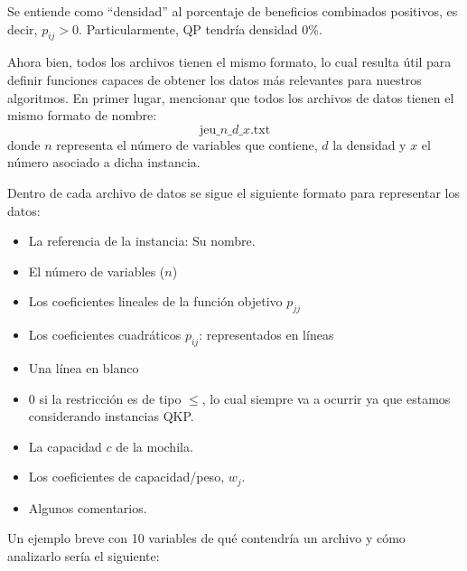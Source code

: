 Se entiende como ``densidad'' al porcentaje de beneficios combinados positivos, es decir, $p_{ij} > 0$. 
Particularmente, QP tendría densidad 0\%.

Ahora bien, todos los archivos tienen el mismo formato, lo cual resulta útil para definir funciones capaces de obtener los datos más relevantes para nuestros algoritmos. 
En primer lugar, mencionar que todos los archivos de datos tienen el mismo formato de nombre:
\begin{equation*}
\text{jeu\_}n\text{\_}d\_x\text{.txt}
\end{equation*}
donde $n$ representa el número de variables que contiene, $d$ la densidad y $x$ el número asociado a dicha instancia. 

Dentro de cada archivo de datos se sigue el siguiente formato para representar los datos:
\begin{itemize}
	\item La referencia de la instancia: Su nombre.
	\item El número de variables ($n$)
	\item Los coeficientes lineales de la función objetivo $p_{jj}$
	\item Los coeficientes cuadráticos $p_{ij}$: representados en líneas
	\item Una línea en blanco
	\item 0 si la restricción es de tipo $\leq$, lo cual siempre va a ocurrir ya que estamos considerando instancias QKP.
	\item La capacidad $c$ de la mochila.
	\item Los coeficientes de capacidad/peso, $w_j$.
	\item Algunos comentarios.
\end{itemize}

Un ejemplo breve con 10 variables de qué contendría un archivo y cómo analizarlo sería el siguiente:

